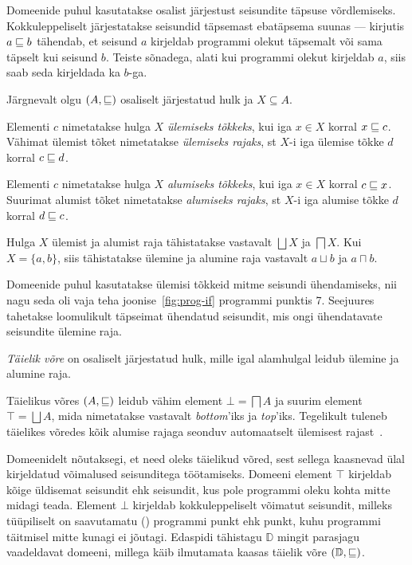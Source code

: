 \documentclass[../thesis.tex]{subfiles}
\begin{document}
Domeenide puhul kasutatakse osalist järjestust seisundite täpsuse võrdlemiseks. Kokkuleppeliselt järjestatakse seisundid täpsemast ebatäpsema suunas --- kirjutis $a \sqsubseteq b$ tähendab, et seisund $a$ kirjeldab programmi olekut täpsemalt või sama täpselt kui seisund $b$. Teiste sõnadega, alati kui programmi olekut kirjeldab $a$, siis saab seda kirjeldada ka $b$-ga.

\noindent
Järgnevalt olgu $(A, \sqsubseteq)$ osaliselt järjestatud hulk ja $X \subseteq A$.

\begin{definition}
\label{def:join}
Elementi $c$ nimetatakse hulga $X$ \emph{ülemiseks tõkkeks}, kui iga $x \in X$ korral $x \sqsubseteq c$. Vähimat ülemist tõket nimetatakse \emph{ülemiseks rajaks}, st $X$-i iga ülemise tõkke $d$ korral $c \sqsubseteq d$.
\end{definition}

\begin{definition}
\label{def:meet}
Elementi $c$ nimetatakse hulga $X$ \emph{alumiseks tõkkeks}, kui iga $x \in X$ korral $c \sqsubseteq x$. Suurimat alumist tõket nimetatakse \emph{alumiseks rajaks}, st $X$-i iga alumise tõkke $d$ korral $d \sqsubseteq c$.
\end{definition}

Hulga $X$ ülemist ja alumist raja tähistatakse vastavalt $\bigsqcup X$ ja $\bigsqcap X$. Kui $X = \{a, b\}$, siis tähistatakse ülemine ja alumine raja vastavalt $a \sqcup b$ ja $a \sqcap b$.

Domeenide puhul kasutatakse ülemisi tõkkeid mitme seisundi ühendamiseks, nii nagu seda oli vaja teha joonise~\ref{fig:prog-if} programmi punktis 7. Seejuures tahetakse loomulikult täpseimat ühendatud seisundit, mis ongi ühendatavate seisundite ülemine raja.

\begin{definition}
\emph{Täielik võre} on osaliselt järjestatud hulk, mille igal alamhulgal leidub ülemine ja alumine raja.
\end{definition}

Täielikus võres $(A, \sqsubseteq)$ leidub vähim element $\bot = \bigsqcap A$ ja suurim element $\top = \bigsqcup A$, mida nimetatakse vastavalt \textit{bottom}'iks ja \textit{top}'iks. Tegelikult tuleneb täielikes võredes kõik alumise rajaga seonduv automaatselt ülemisest rajast~\cite[18]{seidl_foundations}.

Domeenidelt nõutaksegi, et need oleks täielikud võred, sest sellega kaasnevad ülal kirjeldatud võimalused seisunditega töötamiseks. Domeeni element $\top$ kirjeldab kõige üldisemat seisundit ehk seisundit, kus pole programmi oleku kohta mitte midagi teada. Element $\bot$ kirjeldab kokkuleppeliselt võimatut seisundit, milleks tüüpiliselt on saavutamatu () programmi punkt ehk punkt, kuhu programmi täitmisel mitte kunagi ei jõutagi. Edaspidi tähistagu $\mathbb{D}$ mingit parasjagu vaadeldavat domeeni, millega käib ilmutamata kaasas täielik võre $(\mathbb{D}, \sqsubseteq)$.
\end{document}

